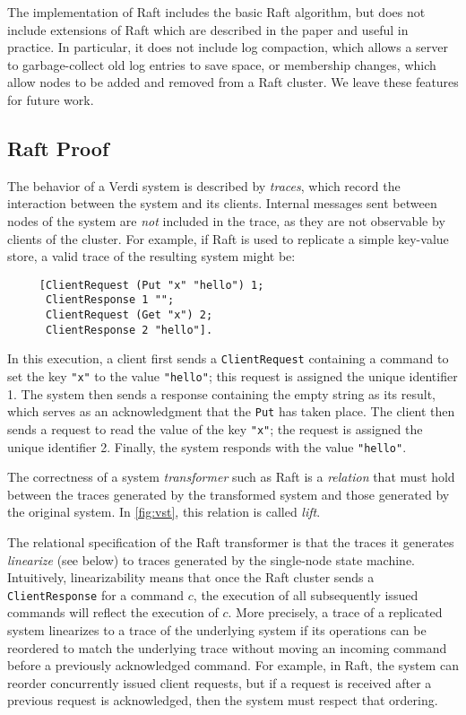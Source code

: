 The \Verdi implementation of Raft includes the basic Raft algorithm,
but does not include extensions of Raft which are described in the
paper and useful in practice. In particular, it does not include log
compaction, which allows a server to garbage-collect old log entries
to save space, or membership changes, which allow nodes to be added
and removed from a Raft cluster. We leave these features for future
work.

\subsection{Raft Proof}\label{ssec:verdi:raft-proof}
The behavior of a Verdi system is described by \emph{traces},
   which record the interaction between the system and its clients.
Internal messages sent between nodes of the system
  are \emph{not} included in the trace,
  as they are not observable by clients of the cluster.
For example, if Raft is used to replicate a simple key-value store,
  a valid trace of the resulting system might be:
\begin{verbatim}
     [ClientRequest (Put "x" "hello") 1;
      ClientResponse 1 "";
      ClientRequest (Get "x") 2;
      ClientResponse 2 "hello"].
\end{verbatim}
In this execution, a client first sends a \texttt{ClientRequest}
  containing a command to set the key \verb|"x"| to the value \verb|"hello"|;
  this request is assigned the unique identifier 1.
The system then sends a response containing the empty string as its result,
  which serves as an acknowledgment that the \texttt{Put} has taken place.
The client then sends a request to read the value of the key \verb|"x"|;
  the request is assigned the unique identifier 2.
Finally, the system responds with the value \verb|"hello"|.

The correctness of a system \textit{transformer} such as Raft
  is a \textit{relation} that must hold between
  the traces generated by the transformed system
  and those generated by the original system.
In \cref{fig:vst}, this relation is called \textit{lift}.

The relational specification of the Raft transformer
  is that the traces it generates \textit{linearize}
  (see below)
  to traces generated by the single-node state machine.
Intuitively, linearizability means that once
  the Raft cluster sends a \texttt{ClientResponse} for a command $c$,
  the execution of all subsequently issued commands will reflect the execution of $c$.
More precisely, a trace of a replicated system linearizes to a trace
of the underlying system if its operations can be reordered to match
the underlying trace without moving an incoming command before a
previously acknowledged command.
For example, in Raft, the system can reorder concurrently issued client requests,
  but if a request is received after a previous request is acknowledged,
  then the system must respect that ordering.

